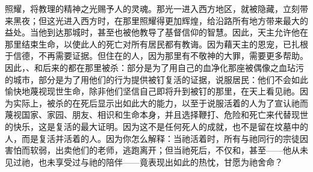 照耀，将教理的精神之光赐予人的灵魂。那光一进入西方地区，就被隐藏，立刻带来黑夜；但这光进入西方时，在那里照耀得更加辉煌，给沿路所有地方带来最大的益处。当他到达那城时，甚至也被他教导了基督信仰的智慧。因此，天主允许他在那里结束生命，以使此人的死亡对所有居民都有教诲。因为藉天主的恩宠，已扎根于信德，不再需要证据。但住在的人，因为那里有不敬神的大罪，需要更多帮助。因此，、和后来的都在那里被杀：部分是为了用自己的血净化那座被偶像之血玷污的城市，部分是为了用他们的行为提供被钉复活的证据，说服居民：他们不会如此愉快地蔑视现世生命，除非他们坚信自己即将升到被钉的那里，在天上看见祂。因为实际上，被杀的在死后显示出如此大的能力，以至于说服活着的人为了宣认祂而蔑视国家、家园、朋友、相识和生命本身，并且选择鞭打、危险和死亡来代替现世的快乐，这是复活的最大证明。因为这不是任何死人的成就，也不是留在坟墓中的人，而是复活并活着的人。因为你怎么解释：当祂活着时，所有与祂同行的宗徒因害怕而软弱，出卖他们的老师，逃跑离开；但当祂死后，不仅和，甚至——他从未见过祂，也未享受过与祂的陪伴——竟表现出如此的热忱，甘愿为祂舍命？\par

